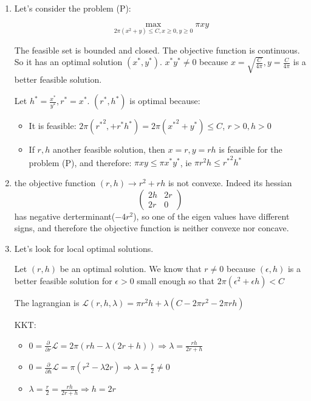 \documentclass[12pt]{article}
\begin{document}
\begin{enumerate}

\item
Let's consider the problem (P):

$$\max_{2\pi(x^2 + y) \le C, x \ge 0, y \ge 0} \pi xy$$

The feasible set is bounded and closed. The objective function is continuous. So it has an optimal solution $(x^*, y^*)$. 
$x^* y^* \ne 0$ because $x = \sqrt {\frac{C}{4\pi}}, y = \frac{C}{4\pi}$ is a better feasible solution.

Let $h^* = \frac {x^*}{y^*}, r^* = x^*$. $(r^*, h^*)$ is optimal because:

\begin{itemize}
\item It is feasible: $2\pi({r^*}^2, + r^*h^*) = 2\pi({x^*}^2 + y^*) \le C$, $r > 0, h > 0$
\item If $r, h$ another feasible solution, then $x = r, y = rh$ is feasible for the problem (P), and therefore: $\pi x y \le \pi x^* y^*$, ie $\pi r^2h \le {r^{*}}^2h^*$
\end{itemize}

\item 
the objective function $(r,h) \rightarrow r^2 + rh$ is not convexe. Indeed its hessian \[\left(\begin{array}{cc}2h&2r\\2r&0\end{array} \right) \]
has negative derterminant($-4r^2$), so one of the eigen values have different signs, and therefore the objective function is neither convexe nor concave.

\item
Let's look for local optimal solutions. 

Let $(r, h)$ be an optimal solution. We know that $r \ne 0$ because $(\epsilon, h)$ is a better feasible solution for $\epsilon > 0$ small enough so that $2\pi(\epsilon^2 + \epsilon h) < C$

The lagrangian is $\mathcal L(r, h, \lambda) = \pi r^2 h + \lambda (C - 2\pi r^2 - 2\pi r h)$

KKT:

\begin{itemize}
\item $0 = \frac{\partial}{ \partial r}\mathcal L = 2\pi (rh - \lambda (2r + h)) \Rightarrow \lambda = \frac{rh}{2r + h}$
\item $0 = \frac{\partial}{ \partial h}\mathcal L = \pi (r^2 - \lambda 2 r) \Rightarrow \lambda = \frac r 2 \ne 0$
\item $\lambda = \frac r 2 = \frac{rh}{2r + h} \Rightarrow h = 2r $


\end{itemize}
\end{enumerate}
\end{document}
